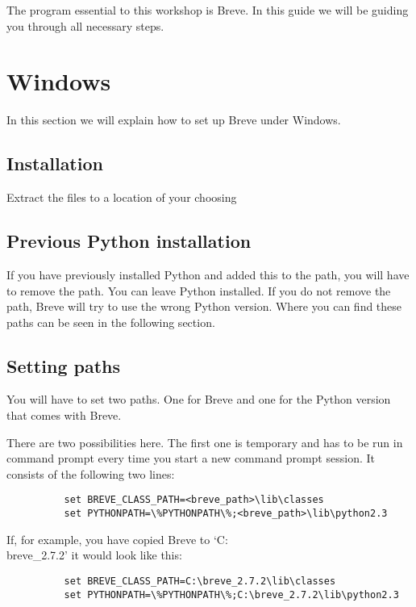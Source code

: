 
The program essential to this workshop is Breve. In this guide we will be guiding you through all necessary steps. 

\section{Windows}
	In this section we will explain how to set up Breve under Windows.

\subsection{Installation}
	Extract the files to a location of your choosing

\subsection{Previous Python installation}
	If you have previously installed Python and added this to the path, you will have to remove the path. You can leave Python installed. If you do not remove the path, Breve will try to use the wrong Python version. Where you can find these paths can be seen in the following section.

\subsection{Setting paths}
	You will have to set two paths. One for Breve and one for the Python version that comes with Breve.

	There are two possibilities here. The first one is temporary and has to be run in command prompt every time you start a new command prompt session. It consists of the following two lines:
	\begin{verbatim}
		  set BREVE_CLASS_PATH=<breve_path>\lib\classes
		  set PYTHONPATH=\%PYTHONPATH\%;<breve_path>\lib\python2.3
	\end{verbatim}
	If, for example, you have copied Breve to `C:\\breve\_2.7.2' it would look like this:
	\begin{verbatim}
		  set BREVE_CLASS_PATH=C:\breve_2.7.2\lib\classes
		  set PYTHONPATH=\%PYTHONPATH\%;C:\breve_2.7.2\lib\python2.3
	\end{verbatim}

